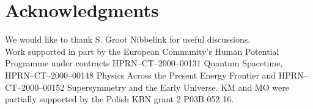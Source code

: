 \documentclass[a4paper,12pt]{article}
\begin{document}
\section*{Acknowledgments}

We would like to thank S. Groot Nibbelink for useful discussions. 
\\ 
Work supported in part by the European Community's Human Potential
Programme under contracts HPRN--CT--2000--00131 Quantum Spacetime,
HPRN--CT--2000--00148 Physics Across the Present Energy Frontier
and HPRN--CT--2000--00152 Supersymmetry and the Early Universe.
KM and MO were partially supported by the Polish KBN grant 
2 P03B 052 16. 
\end{document}
